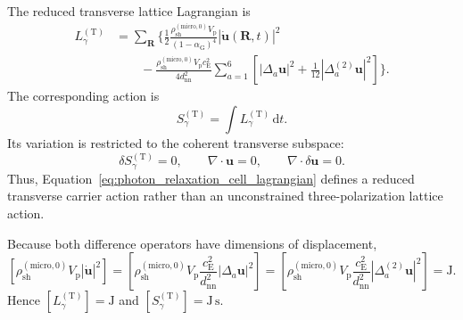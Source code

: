 The reduced transverse lattice Lagrangian is
\begin{align}
    L_{\gamma}^{(\mathrm T)}
    &=
    \sum_{\mathbf R}
    \Bigg\{
        \frac{1}{2}
        \frac{
            \rho_{\mathrm{sh}}^{(\mathrm{micro},0)}
            V_{\mathrm p}
        }{
            \left(
                1-\alpha_{\mathrm G}
            \right)^4
        }
        \left|
            \dot{\mathbf u}(\mathbf R,t)
        \right|^2
    \nonumber\\
    &\qquad
        -
        \frac{
            \rho_{\mathrm{sh}}^{(\mathrm{micro},0)}
            V_{\mathrm p}
            c_{\mathrm E}^2
        }{
            4d_{\mathrm{nn}}^2
        }
        \sum_{a=1}^{6}
        \left[
            \left|
                \Delta_a\mathbf u
            \right|^2
            +
            \frac{1}{12}
            \left|
                \Delta_a^{(2)}\mathbf u
            \right|^2
        \right]
    \Bigg\}.
    \label{eq:photon_relaxation_cell_lagrangian}
\end{align}
The corresponding action is
\begin{equation}
    S_{\gamma}^{(\mathrm T)}
    =
    \int
    L_{\gamma}^{(\mathrm T)}
    \,\mathrm dt.
    \label{eq:photon_relaxation_reduced_action}
\end{equation}
Its variation is restricted to the coherent transverse subspace:
\begin{equation}
    \delta S_{\gamma}^{(\mathrm T)}
    =
    0,
    \qquad
    \nabla\cdot\mathbf u
    =
    0,
    \qquad
    \nabla\cdot\delta\mathbf u
    =
    0.
    \label{eq:photon_relaxation_restricted_variation}
\end{equation}
Thus, Equation~\eqref{eq:photon_relaxation_cell_lagrangian} defines a reduced
transverse carrier action rather than an unconstrained three-polarization
lattice action.

Because both difference operators have dimensions of displacement,
\[
    \left[
        \rho_{\mathrm{sh}}^{(\mathrm{micro},0)}
        V_{\mathrm p}
        \left|
            \dot{\mathbf u}
        \right|^2
    \right]
    =
    \left[
        \rho_{\mathrm{sh}}^{(\mathrm{micro},0)}
        V_{\mathrm p}
        \frac{c_{\mathrm E}^2}{d_{\mathrm{nn}}^2}
        \left|
            \Delta_a\mathbf u
        \right|^2
    \right]
    =
    \left[
        \rho_{\mathrm{sh}}^{(\mathrm{micro},0)}
        V_{\mathrm p}
        \frac{c_{\mathrm E}^2}{d_{\mathrm{nn}}^2}
        \left|
            \Delta_a^{(2)}\mathbf u
        \right|^2
    \right]
    =
    \mathrm J.
\]
Hence
\([L_{\gamma}^{(\mathrm T)}]=\mathrm J\)
and
\([S_{\gamma}^{(\mathrm T)}]=\mathrm{J\,s}\).

